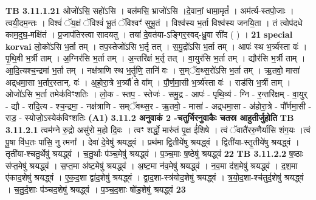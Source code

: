 \documentclass[17pt]{extarticle}
\begin{document}
{{{{{{{{{{{{{{{{{{{{{{                  \newline
                                \textbf{ TB 3.11.1.21} \newline
                  ओजो॑ऽसि॒ सहो॑ऽसि । बल॑मसि॒ भ्राजो॑ऽसि ।दे॒वानां॒ धामा॒मृतं᳚ । अम॑र्त्य-स्तपो॒जाः । त्वयी॒दम॒न्तः । विश्वं॑ ॅय॒क्षं ॅविश्वं॑ भू॒तं ॅविश्वꣳ॑ सुभू॒तं । विश्व॑स्य भ॒र्ता विश्व॑स्य जनयि॒ता । तं त्वोप॑दधे काम॒दुघ॒-मक्षि॑तं । प्र॒जाप॑तिस्त्वा सादयतु । तया॑ दे॒वत॑या-ऽङ्गिर॒स्वद्-ध्रु॒वा सी॑द ( ) । \textbf{ 21} \newline
                  \newline
                                                        \textbf{special korvai} \newline
              लो॒को॑ऽसि भ॒र्ता तम् । तप॒स्तेजो॑ऽसि भ॒र्तृ तत् । स॒मु॒द्रो॑ऽसि भ॒र्ता तम् । आपः॑ स्थ भ॒र्त्र्य॑स्ता वः॑ । पृ॒थि॒वी भ॒र्त्री ताम् । अ॒ग्निर॑सि भ॒र्ता तम् । अ॒न्तरि॑क्षं भ॒र्तृ तत् । वा॒युर॑सि भ॒र्ता तम् । द्यौर॑सि भ॒र्त्री ताम् । आ॒दि॒त्यश्च॒न्द्रमा॑ भ॒र्ता तम् । नक्ष॑त्राणि स्थ भ॒र्तॄणि॒ तानि॑ वः । स॒म्ॅव॒थ्स॒रो॑ऽसि भ॒र्ता तम् । ऋ॒तवो॒ मासा॑ अद्र्धमा॒सा भ॒र्तार॒स्तान्. वः॑ । अ॒हो॒रा॒त्रे भ॒र्त्र्यौ॑ ते वा᳚म् । पौ॒र्ण॒मा॒सी भ॒र्त्र्य॑स्ता वः॑ । राड॑सि भ॒र्त्री ताम् । ओजो॑ऽसि भ॒र्ता तमेक॑विꣳशतिः । \newline
                                लो॒क - स्तप॒ - स्तेजः॑ - समु॒द्र - आपः॑ - पृथि॒व्य॑ - ग्नि - र॒न्तरि॑क्षम् - वा॒युर् - द्यौ - रा॑दि॒त्य - श्च॒न्द्रमा॒ - नक्ष॑त्राणि - सम्ॅवथ्स॒र - ऋ॒तवो॒ - मासा॑ - अद्र्धमा॒सा - अ॑होरा॒त्रे - पौ᳚र्णमा॒सी - राड॒ - स्योजो॒ऽस्येक॑विꣳशतिः \textbf{(A1)} \newline \newline
                \textbf{ 3.11.2    अनुवाकं   2 -चतुर्भिरनुवाकैः चतस्र आहुतीर्जुहोति} \newline
                                \textbf{ TB 3.11.2.1} \newline
                  त्वम॑ग्ने रु॒द्रो असु॑रो म॒हो दि॒वः । त्वꣳ शर्द्धो॒ मारु॑तं पृ॒क्ष ई॑शिषे । त्वं ॅवातै॑ररु॒णैर्या॑सि शंग॒यः ।त्वं पू॒षा वि॑ध॒तः पा॑सि॒ नु त्मना᳚ । देवा॑ दे॒वेषु॑ श्रयद्ध्वं । प्रथ॑मा द्वि॒तीये॑षु श्रयद्ध्वं । द्विती॑या-स्तृ॒तीये॑षु श्रयद्ध्वं । तृती॑या-श्चतु॒र्थेषु॑ श्रयद्ध्वं । च॒तु॒र्थाः प॑ञ्च॒मेषु॑ श्रयद्ध्वं । प॒ञ्च॒माः ष॒ष्ठेषु॑ श्रयद्ध्वं \textbf{ 22} \newline
                  \newline
                                \textbf{ TB 3.11.2.2} \newline
                  ष॒ष्ठाः स॑प्त॒मेषु॑ श्रयद्ध्वं । स॒प्त॒मा अ॑ष्ट॒मेषु॑ श्रयद्ध्वं । अ॒ष्ट॒मा न॑व॒मेषु॑ श्रयद्ध्वं । न॒व॒मा द॑श॒मेषु॑ श्रयद्ध्वं । द॒श॒मा ए॑काद॒शेषु॑ श्रयद्ध्वं । ए॒क॒द॒शा द्वा॑द॒शेषु॑ श्रयद्ध्वं । द्वा॒द॒शा-स्त्र॑योद॒शेषु॑ श्रयद्ध्वं । त्र॒यो॒द॒शा-श्च॑तुर्द॒शेषु॑ श्रयद्ध्वं । च॒तु॒र्द॒शाः प॑ञ्चद॒शेषु॑ श्रयद्ध्वं । प॒ञ्च॒द॒शाः षो॑ड॒शेषु॑ श्रयद्ध्वं \textbf{ 23} \newline
}}}}}}}}}}}}}}}}}}}}}}
\end{document}
